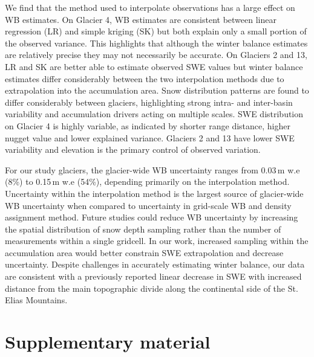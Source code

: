 \documentclass[twocolumn, letterpaper]{igs}
\begin{document}
We find that the method used to interpolate observations has a large effect on WB estimates. On Glacier 4, WB estimates are consistent between linear regression (LR) and simple kriging (SK) but both explain only a small portion of the observed variance. This highlights that although the winter balance estimates are relatively precise they may not necessarily be accurate. On Glaciers 2 and 13, LR and SK are better able to estimate observed SWE values but winter balance estimates differ considerably between the two interpolation methods due to extrapolation into the accumulation area. Snow distribution patterns are found to differ considerably between glaciers, highlighting strong intra- and inter-basin variability and accumulation drivers acting on multiple scales. SWE distribution on Glacier 4 is highly variable, as indicated by shorter range distance, higher nugget value and lower explained variance. Glaciers 2 and 13 have lower SWE variability and elevation is the primary control of observed variation.

For our study glaciers, the glacier-wide WB uncertainty ranges from 0.03\,m w.e (8\%) to 0.15\,m w.e (54\%), depending primarily on the interpolation method. Uncertainty within the interpolation method is the largest source of glacier-wide WB uncertainty when compared to uncertainty in grid-scale WB and density assignment method. Future studies could reduce WB uncertainty by increasing the spatial distribution of snow depth sampling rather than the number of measurements within a single gridcell. In our work, increased sampling within the accumulation area would better constrain SWE extrapolation and decrease uncertainty. Despite challenges in accurately estimating winter balance, our data are consistent with a previously reported linear decrease in SWE with increased distance from the main topographic divide along the continental side of the St. Elias Mountains. 

%
%



\pagebreak 
\section{Supplementary material}
\end{document}
